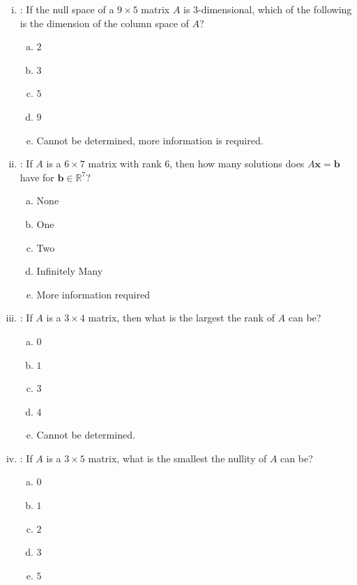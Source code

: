 \documentclass[12pt,letterpaper]{exam}
\begin{document}
\begin{questions}
\begin{enumerate}[(i)]

\item \underline{\itshape\hspace{0.6cm}\hspace{0.6cm}}:  If the null space of a $9 \times 5$ matrix $A$ is $3$-dimensional, which of the following is the dimension of the column space of $A$?
	\begin{enumerate}[(a)]
	\item $2$
	\item $3$
	\item $5$
	\item $9$
	\item Cannot be determined, more information is required.
	\end{enumerate} \vfill %

\item \underline{\itshape\hspace{0.6cm}\hspace{0.6cm}}: If $A$ is a $6 \times 7$ matrix with rank $6$, then how many solutions does $A \mathbf{x}= \mathbf{b}$ have for $\mathbf{b} \in \mathbb{R}^7$?
	\begin{enumerate}[(a)]
	\item None
	\item One
	\item Two
	\item Infinitely Many
	\item More information required
	\end{enumerate} \vfill %

\item \underline{\itshape\hspace{0.6cm}\hspace{0.6cm}}: If $A$ is a $3 \times 4$ matrix, then what is the largest the rank of $A$ can be?
	\begin{enumerate}[(a)]
	\item $0$
	\item $1$
	\item $3$
	\item $4$
	\item Cannot be determined.
	\end{enumerate} \vfill %

\item \underline{\itshape\hspace{0.6cm}\hspace{0.6cm}}: If $A$ is a $3 \times 5$ matrix, what is the smallest the nullity of $A$ can be?
	\begin{enumerate}[(a)]
	\item $0$
	\item $1$
	\item $2$
	\item $3$
	\item $5$
	\end{enumerate} \vfill %


\end{enumerate}
\end{questions}
\end{document}
